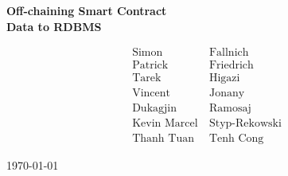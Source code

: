 {
	\vspace*{\fill}

	\begin{spacing}{1.5}
		\centering\huge\bfseries
		\vspace*{-1.5em}
		Off-chaining Smart Contract\\
		Data to RDBMS
	\end{spacing}

	\vspace*{1em}
	\begin{spacing}{1.5}
		\centering\large
		\begin{align*}
			\textrm{Simon}\ &\textrm{Fallnich}\\
			\textrm{Patrick}\ &\textrm{Friedrich}\\
			\textrm{Tarek}\ &\textrm{Higazi}\\
			\textrm{Vincent}\ &\textrm{Jonany}\\
			\textrm{Dukagjin}\ &\textrm{Ramosaj}\\
			\textrm{Kevin Marcel}\ &\textrm{Styp-Rekowski}\\
			\textrm{Thanh Tuan}\ &\textrm{Tenh Cong}
		\end{align*}
	\end{spacing}

	\vspace*{6em}
	\begin{spacing}{1.5}
		\centering\large
		\today
	\end{spacing}

	\vspace*{\fill}

}
